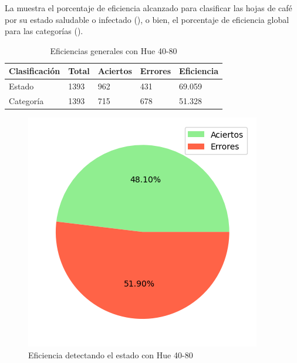 La  muestra el porcentaje de eficiencia alcanzado para clasificar las hojas de café por su estado saludable o infectado (), o bien, el porcentaje de eficiencia global para las categorías ().

\begin{table}[h!]
\centering
\begin{tabular}{|l|l|l|l|l|}
\hline 
\textbf{Clasificación} & \textbf{Total} & \textbf{Aciertos} & \textbf{Errores} & \textbf{Eficiencia} \\
\hline
Estado & 1393 & 962 & 431 & 69.059 \\
\hline 
Categoría & 1393 & 715 & 678 & 51.328 \\
\hline 
\end{tabular}
\caption{Eficiencias generales con Hue 40-80}
\label{table:efficiency_general_40_80}
\end{table}

\captionsetup[figure]{skip=-10pt}

\begin{figure}[!ht]
\centering
\includegraphics[scale=0.6]{images/result_global_state_40_80.png}
\caption{Eficiencia detectando el estado con Hue 40-80}
\label{img:efficiency_state_40_80}
\end{figure}

